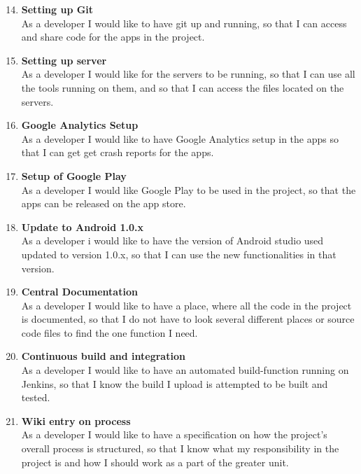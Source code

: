 \begin{enumerate}
	\setcounter{enumi}{13} %
	
	\item \textbf{Setting up Git}\\
	As a developer I would like to have git up and running, so that I can access and share code for the apps in the project.
	
	\item \textbf{Setting up server}\\
	As a developer I would like for the servers to be running, so that I can use all the tools running on them, and so that I can access the files located on the servers.
	
	\item \textbf{Google Analytics Setup}\\
	As a developer I would like to have Google Analytics setup in the apps so that I can get get crash reports for the apps.
	
	\item \textbf{Setup of Google Play}\\
	As a developer I would like Google Play to be used in the project, so that the apps can be released on the app store.
	
	\item \textbf{Update to Android 1.0.x}\\
	As a developer i would like to have the version of Android studio used updated to version 1.0.x, so that I can use the new functionalities in that version.
	
	\item \textbf{Central Documentation}\\
	As a developer I would like to have a place, where all the code in the project is documented, so that I do not have to look several different places or source code files to find the one function I need.
	
	\item \textbf{Continuous build and integration}\\
	As a developer I would like to have an automated build-function running on Jenkins, so that I know the build I upload is attempted to be built and tested.
	
	\item \textbf{Wiki entry on process}\\
	As a developer I would like to have a specification on how the project’s overall process is structured, so that I know what my responsibility in the project is and how I should work as a part of the greater unit.
\end{enumerate}


